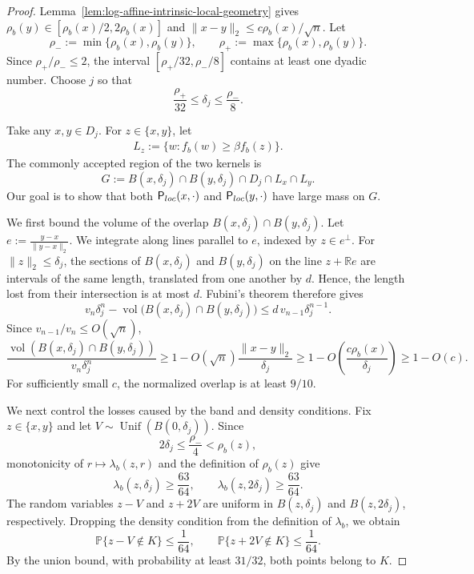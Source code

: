 \documentclass[10pt,a4paper]{amsart}
\newcommand{\Prb}{\mathbb P}
\newcommand{\R}{\mathbb R}
\newcommand{\Unif}{\operatorname{Unif}}
\newcommand{\vol}{\operatorname{vol}}
\begin{document}
\begin{proof}
Lemma~\ref{lem:log-affine-intrinsic-local-geometry} gives
$\rho_b(y)\in[\rho_b(x)/2,2\rho_b(x)]$ and
$\|x-y\|_2\le c\rho_b(x)/\sqrt n$.  Let
\[
 \rho_-:=\min\{\rho_b(x),\rho_b(y)\},
 \qquad
 \rho_+:=\max\{\rho_b(x),\rho_b(y)\}.
\]
Since $\rho_+/\rho_-\le2$, the interval
$[\rho_+/32,\rho_-/8]$ contains at least one dyadic number.  Choose $j$ so that
\begin{equation}\label{eq:log-affine-overlap-scale}
 \frac{\rho_+}{32}\le\delta_j\le\frac{\rho_-}{8}.
\end{equation}

Take any $x,y\in D_j$.  For $z\in \{x,y\}$, let 
\begin{align*}
    L_z:=\{w:f_b(w)\ge\beta f_b(z)\}.
\end{align*}
The commonly accepted region of the two kernels is
\[
 G:=B(x,\delta_j)\cap B(y,\delta_j)\cap D_j\cap L_x\cap L_y.
\]
Our goal is to show that both ${\sf P}_{\rm loc}(x,\cdot)$ and ${\sf P}_{\rm loc}(y,\cdot)$ have large mass on $G$.

We first bound the volume of the overlap $B(x,\delta_j)\cap B(y,\delta_j)$. Let $e:=\frac{y-x}{\|y-x\|_2}$.  We integrate along lines parallel to $e$, indexed by $z\in e^\perp$.  For $\|z\|_2\le\delta_j$, the sections of $B(x,\delta_j)$ and $B(y,\delta_j)$ on the line $z+\R e$ are intervals of the same length, translated from one another by $d$.  Hence, the length lost from their intersection is at most $d$.  Fubini's theorem
therefore gives
\[
 v_n\delta_j^n
 -\vol\bigl(B(x,\delta_j)\cap B(y,\delta_j)\bigr)\le
 d\,v_{n-1}\delta_j^{n-1}.
\]
Since $v_{n-1}/v_n\leq O(\sqrt n)$,
\[
 \frac{\vol(B(x,\delta_j)\cap B(y,\delta_j))}
 {v_n\delta_j^n}
 \ge
 1-O(\sqrt n)\frac{\|x-y\|_2}{\delta_j}\geq 1-O\left(\frac{c\rho_b(x)}{\delta_j}\right)\geq 1-O(c).
\]
For sufficiently small $c$, the normalized overlap is at least $9/10$.

We next control the losses caused by the band and density conditions. Fix $z\in\{x,y\}$ and let $V\sim\Unif(B(0,\delta_j))$.  Since
\[
 2\delta_j
 \le\frac{\rho_-}{4}
 <\rho_b(z),
\]
monotonicity of
$r\mapsto\lambda_b(z,r)$ and the definition of $\rho_b(z)$ give
\[
 \lambda_b(z,\delta_j)\ge \frac{63}{64},
 \qquad
 \lambda_b(z,2\delta_j)\ge\frac{63}{64}.
\]
The random variables $z-V$ and $z+2V$ are uniform in
$B(z,\delta_j)$ and $B(z,2\delta_j)$, respectively.  Dropping the
density condition from the definition of $\lambda_b$, we obtain
\[
 \Prb\{z-V\notin K\}\le \frac{1}{64},
 \qquad
 \Prb\{z+2V\notin K\}\le \frac{1}{64}.
\]
By the union bound, with probability at least $31/32$, both points belong to $K$.


\end{proof}
\end{document}
